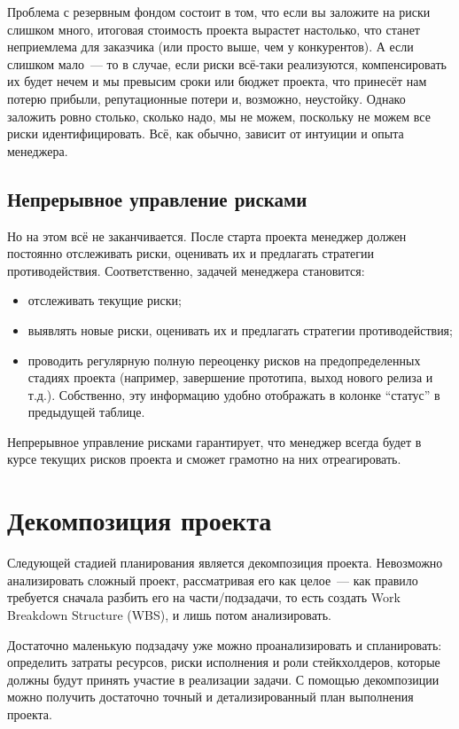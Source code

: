 \documentclass{../../text-style}
\begin{document}
Проблема с резервным фондом состоит в том, что если вы заложите на риски слишком много, итоговая стоимость проекта вырастет настолько, что станет неприемлема для заказчика (или просто выше, чем у конкурентов). А если слишком мало~--- то в случае, если риски всё-таки реализуются, компенсировать их будет нечем и мы превысим сроки или бюджет проекта, что принесёт нам потерю прибыли, репутационные потери и, возможно, неустойку. Однако заложить ровно столько, сколько надо, мы не можем, поскольку не можем все риски идентифицировать. Всё, как обычно, зависит от интуиции и опыта менеджера.

\subsection{Непрерывное управление рисками}

Но на этом всё не заканчивается. После старта проекта менеджер должен постоянно отслеживать риски, оценивать их и предлагать стратегии противодействия. Соответственно, задачей менеджера становится:

\begin{itemize}
    \item отслеживать текущие риски;
    \item выявлять новые риски, оценивать их и предлагать стратегии противодействия;
    \item проводить регулярную полную переоценку рисков на предопределенных стадиях проекта (например, завершение прототипа, выход нового релиза и т.д.). Собственно, эту информацию удобно отображать в колонке \enquote{статус} в предыдущей таблице.
\end{itemize}

Непрерывное управление рисками гарантирует, что менеджер всегда будет в курсе текущих рисков проекта и сможет грамотно на них отреагировать.

\section{Декомпозиция проекта}

Следующей стадией планирования является декомпозиция проекта. Невозможно анализировать сложный проект, рассматривая его как целое~--- как правило требуется сначала разбить его на части/подзадачи, то есть создать Work Breakdown Structure (WBS), и лишь потом анализировать.

Достаточно маленькую подзадачу уже можно проанализировать и спланировать: определить затраты ресурсов, риски исполнения и роли стейкхолдеров, которые должны будут принять участие в реализации задачи. С помощью декомпозиции можно получить достаточно точный и детализированный план выполнения проекта.
\end{document}
